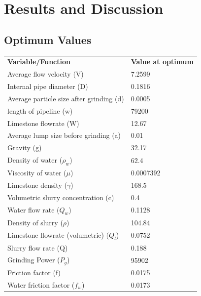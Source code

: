 \documentclass{article}
\begin{document}
\section{Results and Discussion}
\subsection{Optimum Values}
\begin{center}
\begin{tabular}{|l|l|}
	\hline
	\textbf{Variable/Function}               & \textbf{Value at optimum} \\
	Average flow velocity (V)                & 7.2599                    \\
	Internal pipe diameter (D)               & 0.1816                    \\
	\cellcolor{yellow}Average particle size after grinding (d) & 0.0005                    \\
	length of pipeline (w)                   & 79200                     \\
	Limestone flowrate (W)                   & 12.67                     \\
	Average lump size before grinding (a)    & 0.01                      \\
	Gravity (g)                              & 32.17                     \\
	Density of water ($\rho_w$)              & 62.4                      \\
	Viscosity of water ($\mu$)               & 0.0007392                 \\
	Limestone density ($\gamma$)             & 168.5                     \\
	\cellcolor{yellow}Volumetric slurry concentration (c)      & 0.4                       \\
	Water flow rate ($Q_w$)                  & 0.1128                    \\
	Density of slurry ($\rho$)               & 104.84                    \\
	Limestone flowrate (volumetric) ($Q_l$)  & 0.0752                    \\
	Slurry flow rate (Q)                     & 0.188                     \\
	Grinding Power ($P_g$)                   & 95902                     \\
	Friction factor (f)                      & 0.0175                    \\
	Water friction factor ($f_w$)            & 0.0173                    \\

\end{tabular}
\end{center}
\end{document}
